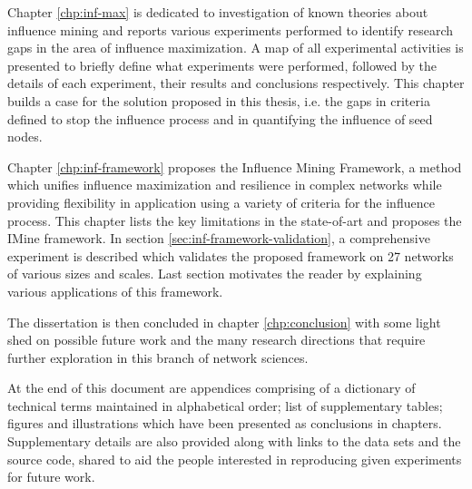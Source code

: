 \documentclass[a4paper,10pt,times,numbered,print,index]{PhDThesisPSnPDF}
\begin{document}
	Chapter \ref{chp:inf-max} is dedicated to investigation of known theories about influence mining and reports various experiments performed to identify research gaps in the area of influence maximization. A map of all experimental activities is presented to briefly define what experiments were performed, followed by the details of each experiment, their results and conclusions respectively. This chapter builds a case for the solution proposed in this thesis, i.e. the gaps in criteria defined to stop the influence process and in quantifying the influence of seed nodes.
    
    Chapter \ref{chp:inf-framework} proposes the Influence Mining Framework, a method which unifies influence maximization and resilience in complex networks while providing flexibility in application using a variety of criteria for the influence process. This chapter lists the key limitations in the state-of-art and proposes the IMine framework. In section \ref{sec:inf-framework-validation}, a comprehensive experiment is described which validates the proposed framework on 27 networks of various sizes and scales. Last section motivates the reader by explaining various applications of this framework.

	The dissertation is then concluded in chapter \ref{chp:conclusion} with some light shed on possible future work and the many research directions that require further exploration in this branch of network sciences.

	At the end of this document are appendices comprising of a dictionary of technical terms maintained in alphabetical order; list of supplementary tables; figures and illustrations which have been presented as conclusions in chapters. Supplementary details are also provided along with links to the data sets and the source code, shared to aid the people interested in reproducing given experiments for future work.


    
    
    
    
	
    
	

	

	

	
	
\end{document}
